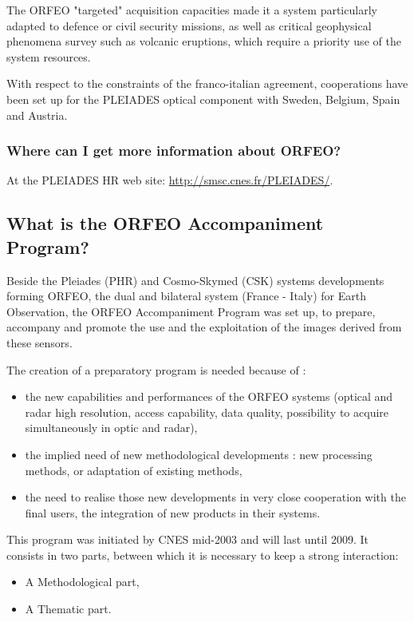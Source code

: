 The ORFEO "targeted" acquisition capacities made it a system
particularly adapted to defence or civil security missions, as well as
critical geophysical phenomena survey such as volcanic eruptions,
which require a priority use of the system resources.


With respect to the constraints of the franco-italian agreement,
cooperations have been set up for the PLEIADES optical component with
Sweden, Belgium, Spain and Austria.

\subsubsection{Where can I get more information about ORFEO?}
At the PLEIADES HR web site: \url{http://smsc.cnes.fr/PLEIADES/}.

\subsection{What is the ORFEO Accompaniment Program?}
Beside the Pleiades (PHR) and Cosmo-Skymed (CSK) systems developments forming ORFEO, the dual and bilateral system (France - Italy) for Earth Observation, the ORFEO Accompaniment Program was set up, to prepare, accompany and promote the use and the exploitation of the images derived from these sensors.

The creation of a preparatory program is needed because of :
\begin{itemize}
  \item  the new capabilities and performances of the ORFEO systems (optical and radar high resolution, access capability, data quality, possibility to acquire simultaneously in optic and radar),
  \item the implied need of new methodological developments : new processing methods, or adaptation of existing methods,
  \item the need to realise those new developments in very close cooperation with the final users, the integration of new products in their systems.
\end{itemize}
  

This program was initiated by CNES mid-2003 and will last until 2009.
It consists in two parts, between which it is necessary to keep a strong interaction:
\begin{itemize}
\item A Methodological part,
\item A Thematic part.
\end{itemize}



